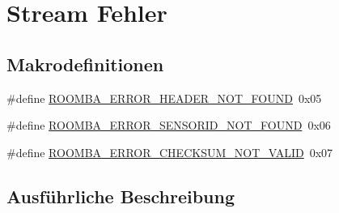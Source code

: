 \hypertarget{group__roomba__error__stream}{\section{Stream Fehler}
\label{group__roomba__error__stream}
}
\subsection*{Makrodefinitionen}
\begin{DoxyCompactItemize}
\item 
\#define \hyperlink{group__roomba__error__stream_gaccb52301b5b2449935f09b113b19b2b2}{R\-O\-O\-M\-B\-A\-\_\-\-E\-R\-R\-O\-R\-\_\-\-H\-E\-A\-D\-E\-R\-\_\-\-N\-O\-T\-\_\-\-F\-O\-U\-N\-D}~0x05
\item 
\#define \hyperlink{group__roomba__error__stream_ga951d522c2e15b1bb9b1e7367a0124e12}{R\-O\-O\-M\-B\-A\-\_\-\-E\-R\-R\-O\-R\-\_\-\-S\-E\-N\-S\-O\-R\-I\-D\-\_\-\-N\-O\-T\-\_\-\-F\-O\-U\-N\-D}~0x06
\item 
\#define \hyperlink{group__roomba__error__stream_ga2ee060350797b7c170ffcd035e40a034}{R\-O\-O\-M\-B\-A\-\_\-\-E\-R\-R\-O\-R\-\_\-\-C\-H\-E\-C\-K\-S\-U\-M\-\_\-\-N\-O\-T\-\_\-\-V\-A\-L\-I\-D}~0x07
\end{DoxyCompactItemize}


\subsection{Ausführliche Beschreibung}


